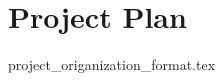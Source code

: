 \documentclass{article}
\begin{document}

\section*{Project Plan}
{project_origanization_format.tex}



\end{document}
